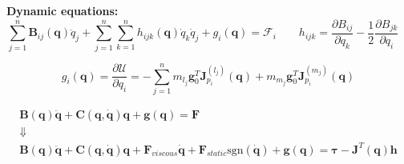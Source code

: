 \vspace*{10pt}
\textbf{Dynamic equations: }
$$
\sum_{j=1}^n \bm{B}_{ij}(\bm{q}) \ddot{q}_j
+
\sum_{j=1}^n \sum_{k=1}^n h_{ijk} (\bm{q}) \dot{q}_k \dot{q}_j 
+
g_i(\bm{q})
=
\mathcal{F}_i
\qquad
h_{ijk}
=
\frac{\partial B_{ij}}{\partial q_k}
-
\frac{1}{2} \frac{\partial B_{jk}}{\partial q_i}
\quad
$$

$$
g_i(\bm{q})
=
\frac{\partial \mathcal{U}}{\partial q_i}
=
-\sum_{j=1}^n m_{l_j}\bm{g}_0^T \bm{J}^{(l_j)}_{p_i}(\bm{q}) + m_{m_j}\bm{g}_0^T  \bm{J}^{(m_j)}_{p_i}(\bm{q})
$$

\vspace*{5pt}
\begin{gather*}
\bm{B}(\bm{q})\bm{\ddot{q}} + \bm{C}(\bm{q}, \bm{\dot{q}})\bm{q} + \bm{g}(\bm{q})= \mathcal{\bm{F}} \\
\Downarrow \\
\bm{B}(\bm{q})\bm{\ddot{q}} + \bm{C}(\bm{q}, \bm{\dot{q}})\bm{q} +
\bm{F}_{viscous}\dot{\bm{q}} 
+
\bm{F}_{static} \text{sgn}(\dot{\bm{q}})
+
\bm{g}(\bm{q})
= 
\bm{\tau}
-
\bm{J}^T(\bm{q}) \bm{h}
\end{gather*}
\vspace{-5pt}
